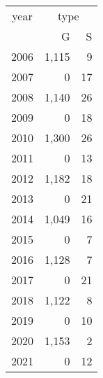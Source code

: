 \footnotesize\begin{tabular}[t]{lrr}
\toprule
\multicolumn{1}{c}{year} & \multicolumn{2}{c}{type} \\
\cmidrule(l{3pt}r{3pt}){1-1} \cmidrule(l{3pt}r{3pt}){2-3}
  & G & S\\
\midrule
2006 & 1,115 & 9\\
2007 & 0 & 17\\
2008 & 1,140 & 26\\
2009 & 0 & 18\\
2010 & 1,300 & 26\\
2011 & 0 & 13\\
2012 & 1,182 & 18\\
2013 & 0 & 21\\
2014 & 1,049 & 16\\
2015 & 0 & 7\\
2016 & 1,128 & 7\\
2017 & 0 & 21\\
2018 & 1,122 & 8\\
2019 & 0 & 10\\
2020 & 1,153 & 2\\
2021 & 0 & 12\\
\bottomrule
\end{tabular}
